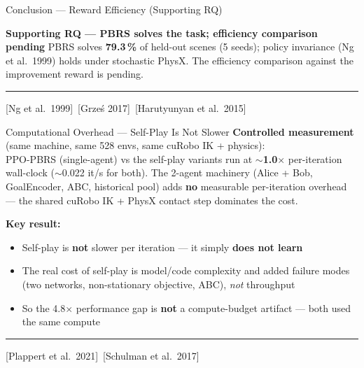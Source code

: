 \documentclass[aspectratio=169,xcolor=dvipsnames,t]{beamer}
\newcommand{\litfooter}[1]{%
  \vspace{2pt}%
  \hrule%
  \vspace{2pt}%
  {\tiny\color{LightDarkGrey} #1}%
}
\begin{document}
\begin{frame}[t]{Conclusion — Reward Efficiency (Supporting RQ)}
  \begin{block}{\textbf{Supporting RQ — PBRS solves the task; efficiency comparison pending}}
    \small
    PBRS solves \textbf{79.3\,\%} of held-out scenes (5 seeds); policy invariance (Ng et al.\ 1999) holds under stochastic PhysX. The efficiency comparison against the improvement reward is pending.
  \end{block}

  \vfill\litfooter{[Ng et al.\ 1999]~[Grze\'s 2017]~[Harutyunyan et al.\ 2015]}
\end{frame}



\begin{frame}[t]{Computational Overhead — Self-Play Is Not Slower}
  \textbf{Controlled measurement} (same machine, same 528 envs, same cuRobo IK + physics): \\
  PPO-PBRS (single-agent) vs the self-play variants run at \textcolor{hlgreen}{\textbf{$\sim$1.0$\times$}} per-iteration wall-clock ($\sim$0.022 it/s for both). The 2-agent machinery (Alice + Bob, GoalEncoder, ABC, historical pool) adds \textbf{no} measurable per-iteration overhead — the shared cuRobo IK + PhysX contact step dominates the cost.

  \vspace{4pt}
  \textbf{Key result:}
  \begin{itemize}
    \item Self-play is \textbf{not} slower per iteration — it simply \textbf{does not learn}
    \item The real cost of self-play is model/code complexity and added failure modes (two networks, non-stationary objective, ABC), \emph{not} throughput
    \item So the 4.8$\times$ performance gap is \textbf{not} a compute-budget artifact — both used the same compute
  \end{itemize}

  \vfill\litfooter{[Plappert et al.\ 2021]~[Schulman et al.\ 2017]}
\end{frame}
\end{document}

